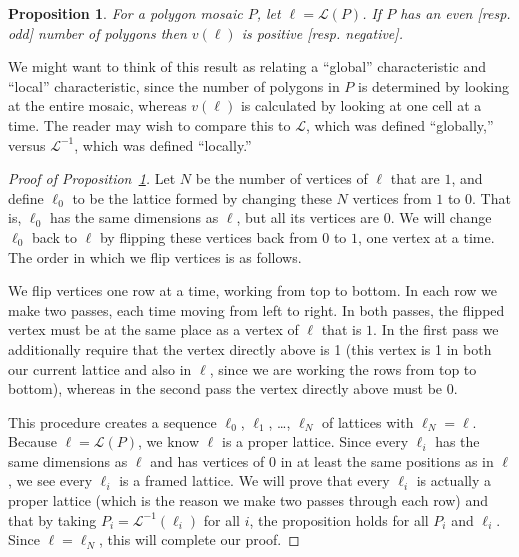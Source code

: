 \documentclass[12pt]{article}
\theoremstyle{plain}
\newtheorem{prop}[thm]{Proposition}
\theoremstyle{remark}
\theoremstyle{definition}
\theoremstyle{remark}
\theoremstyle{definition}
\begin{document}
\begin{prop}
For a polygon mosaic $P$, let $\ell=\mathscr{L}\left(P\right)$. If $P$ has an even {[}resp. odd{]} number of polygons then $v\left(\ell\right)$
is positive {[}resp. negative{]}.
\label{prop: sign of v}
\end{prop}

We might want to think of this result as relating a ``global'' characteristic and ``local'' characteristic, since the number of polygons in $P$ is determined by looking at the entire mosaic, whereas $v\left(\ell\right)$ is calculated by looking at one cell at a time. The reader may wish to compare this to $\mathscr{L}$, which was defined ``globally,'' versus $\mathscr{L}^{-1}$, which was defined ``locally.''

\begin{proof}[Proof of Proposition~\ref{prop: sign of v}] Let $N$ be the number of vertices of $\ell$ that are $1$, and define $\ell_{0}$ to be the lattice formed by changing these $N$ vertices from $1$ to $0$. That is, $\ell_{0}$ has the same dimensions as $\ell$, but all its vertices are $0$. We will change $\ell_{0}$ back to $\ell$ by flipping these vertices back from $0$ to $1$, one vertex at a time. The order in which we flip vertices is as follows.

We flip vertices one row at a time, working from top to bottom. In each row we make two passes, each time moving from left to right. In both passes, the flipped vertex must be at the same place as a vertex of $\ell$ that is $1$.  In the first pass we additionally require that the vertex directly above is 1 (this vertex is 1 in both our current lattice and also in $\ell$, since we are working the rows from top to bottom), whereas in the second pass the vertex directly above must be $0$.

This procedure creates a sequence $\ell_{0}$, $\ell_{1}$, \ldots , $\ell_{N}$ of lattices with $\ell_{N}=\ell$. Because $\ell=\mathscr{L}\left(P\right)$, we know $\ell$ is a proper lattice. Since every $\ell_{i}$ has the same dimensions as $\ell$ and has vertices of $0$ in at least the same positions as in $\ell$, we see every $\ell_{i}$ is a framed lattice. We will prove that every $\ell_{i}$ is actually a proper lattice (which is the reason we make two passes through each row) and that by taking $P_{i}=\mathscr{L}^{-1}\left(\ell_{i}\right)$ for all $i$, the proposition holds for all $P_{i}$ and $\ell_{i}$. Since $\ell = \ell_N$, this will complete our proof.


\end{proof}
\end{document}
